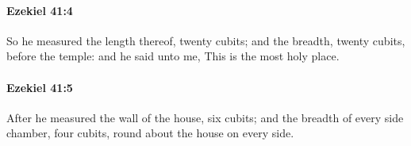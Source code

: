 		\paragraph{Ezekiel 41:4} %
			\label{EZEKIEL-41-4}

			So he measured the length thereof, twenty cubits; and the breadth, twenty cubits, before the temple: and he said unto me, This is the most holy place.


		\paragraph{Ezekiel 41:5} %
			\label{EZEKIEL-41-5}

			After he measured the wall of the house, six cubits; and the breadth of every side chamber, four cubits, round about the house on every side.


